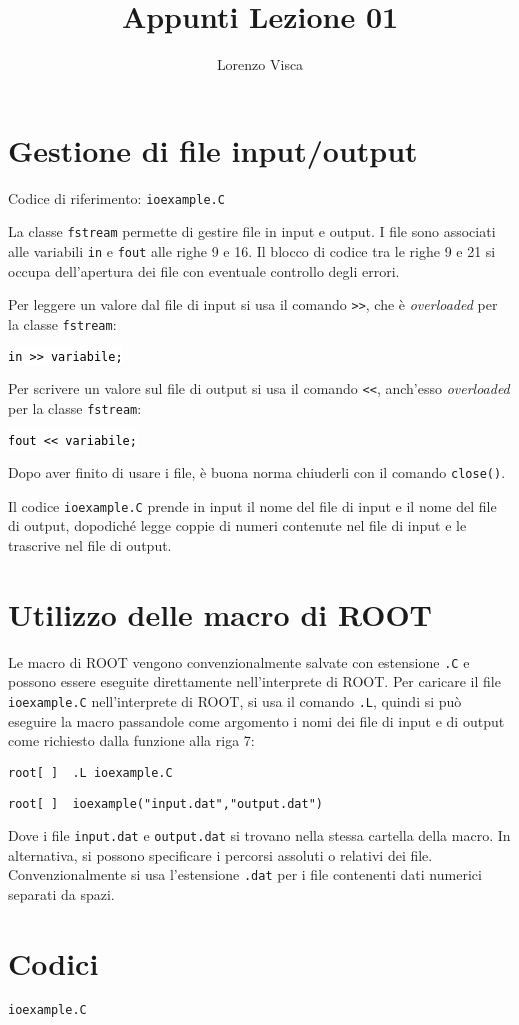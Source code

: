 \documentclass{article}
\title{Appunti Lezione 01}
\author{Lorenzo Visca}
\date{}
\newcommand{\ttt}{\texttt}
\newcommand{\tcpp}[1]{\colorbox{background}{\textcolor{black}{\texttt{#1}}}}
\newcommand{\troot}[1]{\hspace{10pt}\colorbox{bashbackground}{\textcolor{bashtext}{\texttt{root[~]~~#1}}}}
\begin{document}
\maketitle

\section{Gestione di file input/output}
Codice di riferimento: \ttt{ioexample.C} \vspace{10pt}

La classe \ttt{fstream} permette di gestire file in input e output. I file sono associati alle variabili \ttt{in} e \ttt{fout} alle righe 9 e 16.
Il blocco di codice tra le righe 9 e 21 si occupa dell'apertura dei file con eventuale controllo degli errori.

Per leggere un valore dal file di input si usa il comando \ttt{>>}, che è \textit{overloaded} per la classe \ttt{fstream}:

\hspace{10pt}\tcpp{in >> variabile;}

Per scrivere un valore sul file di output si usa il comando \ttt{<<}, anch'esso \textit{overloaded} per la classe \ttt{fstream}:

\hspace{10pt}\tcpp{fout << variabile;}

Dopo aver finito di usare i file, è buona norma chiuderli con il comando \ttt{close()}.
\vspace{5pt}

Il codice \ttt{ioexample.C} prende in input il nome del file di input e il nome del file di output, dopodiché legge coppie di numeri contenute nel file di input e le trascrive nel file di output.

\section{Utilizzo delle macro di ROOT}
Le macro di ROOT vengono convenzionalmente salvate con estensione \ttt{.C} e possono essere eseguite direttamente nell'interprete di ROOT. Per caricare il file \ttt{ioexample.C} nell'interprete di ROOT, si usa il comando \ttt{.L}, quindi si può eseguire la macro passandole come argomento i nomi dei file di input e di output come richiesto dalla funzione alla riga 7:
\vspace{5pt}

\troot{.L ioexample.C}

\troot{ioexample("input.dat","output.dat")}
\vspace{5pt}

Dove i file \ttt{input.dat} e \ttt{output.dat} si trovano nella stessa cartella della macro. In alternativa, si possono specificare i percorsi assoluti o relativi dei file. Convenzionalmente si usa l'estensione \ttt{.dat} per i file contenenti dati numerici separati da spazi.

\newpage
\section{Codici}

\ttt{ioexample.C}

\end{document}
